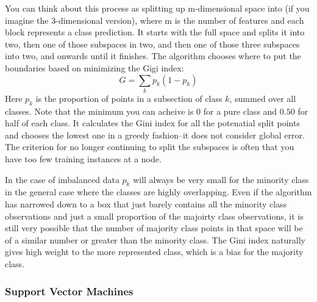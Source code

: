 \documentclass{article}
\begin{document}
You can think about this process as splitting up m-dimensional space into  (if you imagine the 3-dimensional version), where m is the number of features and each block represents a class prediction. It starts with the full space and splits it into two, then one of those subspaces in two, and then one of those three subspaces into two, and onwards until it finishes.
The algorithm chooses where to put the boundaries based on minimizing the Gigi index:
\begin{equation}
G={\textstyle \sum_{k}p_{k}(1-p_{k})}
\end{equation}
Here $p_k$ is the proportion of points in a subsection of class $k$, summed over all classes.
Note that the minimum you can acheive is 0 for a pure class and $0.50$ for half of each class. It calculates the Gini index for all the potenatial split points and chooses the lowest one in a greedy fashion--it does not consider global error. The criterion for no longer continuing to split the subspaces is often that you have too few training instances at a node.

In the case of imbalanced data $p_k$ will always be very small for the minority class in the general case where the classes are highly overlapping. Even if the algorithm has narrowed down to a box that just barely contains all the minority class observations and just a small proportion of the majoirty class observations, it is still very possible that the number of majority class points in that space will be of a similar number or greater than the minority class. The Gini index naturally gives high weight to the more represented class, which is a bias for the majority class.

\subsubsection{Support Vector Machines}
\end{document}
